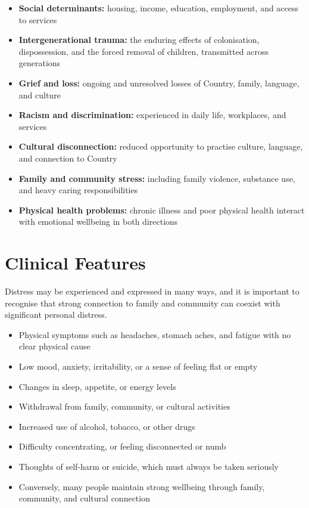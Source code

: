 \begin{itemize}
    \item \textbf{Social determinants:} housing, income, education, employment, and access to services
    \item \textbf{Intergenerational trauma:} the enduring effects of colonisation, dispossession, and the forced removal of children, transmitted across generations
    \item \textbf{Grief and loss:} ongoing and unresolved losses of Country, family, language, and culture
    \item \textbf{Racism and discrimination:} experienced in daily life, workplaces, and services
    \item \textbf{Cultural disconnection:} reduced opportunity to practise culture, language, and connection to Country
    \item \textbf{Family and community stress:} including family violence, substance use, and heavy caring responsibilities
    \item \textbf{Physical health problems:} chronic illness and poor physical health interact with emotional wellbeing in both directions
\end{itemize}

\section*{Clinical Features}
Distress may be experienced and expressed in many ways, and it is important to recognise that strong connection to family and community can coexist with significant personal distress.

\begin{itemize}
    \item Physical symptoms such as headaches, stomach aches, and fatigue with no clear physical cause
    \item Low mood, anxiety, irritability, or a sense of feeling flat or empty
    \item Changes in sleep, appetite, or energy levels
    \item Withdrawal from family, community, or cultural activities
    \item Increased use of alcohol, tobacco, or other drugs
    \item Difficulty concentrating, or feeling disconnected or numb
    \item Thoughts of self-harm or suicide, which must always be taken seriously
    \item Conversely, many people maintain strong wellbeing through family, community, and cultural connection
\end{itemize}

